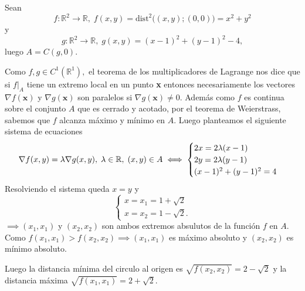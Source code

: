 \begin{solution}
    Sean
    \[
        f: \mathbb{R}^2 \rightarrow \mathbb{R}, \; f(x,y) = \text{dist}^2\Big((x,y);(0,0)\Big)  = x^2 + y^2
    \]
    y
    \[
        g: \mathbb{R}^2 \rightarrow \mathbb{R}, \; g(x,y) = (x-1)^2 + (y-1)^2 - 4,
    \]
    luego $A=C(g,0) $.

    Como $f,g \in C^1( \mathbb{R}^1),$  el teorema de los multiplicadores de Lagrange nos dice que si $f \big\rvert _A$ tiene un extremo local en un punto \textbf{x} entonces necesariamente los vectores $\nabla f(\textbf{x})$ y $\nabla g(\textbf{x})$ son paralelos si $\nabla g(\textbf{x}) \neq 0$.   Además como $f$ es continua sobre el conjunto $A$ que es cerrado y acotado, por el teorema de Weierstrass, sabemos que $f$ alcanza m\'aximo y m\'inimo en $A$. Luego planteamos el siguiente sistema de ecuaciones
    \[
        \nabla f(x,y) = \lambda \nabla g(x,y), \; \lambda \in \mathbb{R}, \; (x,y) \in A \\
        \iff \begin{cases}
            2x = 2\lambda(x-1) \\
            2y = 2\lambda(y-1) \\
            (x-1)^2 + (y-1)^2 = 4
        \end{cases}
    \]
    Resolviendo el sistema queda $x=y$  \;  y \[ \begin{cases}
            x=   x_1=1+\sqrt{2} \\
            x=  x_2=1-\sqrt{2}.
        \end{cases}\]
    $\implies (x_1,x_1)$  y $(x_2,x_2)$  son ambos extremos absulutos de la función $f$  en $A$. Como $f(x_1,x_1) > f(x_2,x_2) \implies (x_1,x_1)$ es máximo absoluto y $(x_2,x_2)$ es mínimo absoluto.

    Luego  la distancia mínima del circulo al origen es $\sqrt{f(x_2,x_2)} = 2-\sqrt{2} $ y la distancia máxima $\sqrt{f(x_1,x_1)} = 2+\sqrt{2}$.
\end{solution}

